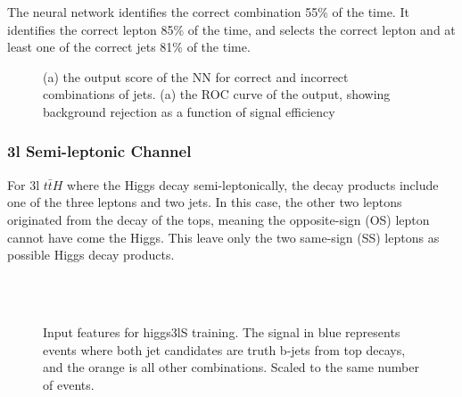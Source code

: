 The neural network identifies the correct combination 55\% of the time. It identifies the correct lepton 85\% of the time, and selects the correct lepton and at least one of the correct jets 81\% of the time. 

\begin{figure}[h!]
  \label{fig:higgs2lSSresults}
  \caption{(a) the output score of the NN for correct and incorrect combinations of jets. (a) the ROC curve of the output, showing background rejection as a function of signal efficiency}
\end{figure} 


\subsubsection{3l Semi-leptonic Channel}
\label{subsec:higgs3lS}

For 3l $t\bar{t}H$ where the Higgs decay semi-leptonically, the decay products include one of the three leptons and two jets. In this case, the other two leptons originated from the decay of the tops, meaning the opposite-sign (OS) lepton cannot have come the Higgs. This leave only the two same-sign (SS) leptons as possible Higgs decay products. 



\begin{figure}[h!]
    \\
    \\
    \caption{Input features for higgs3lS training. The signal in blue represents events where both jet candidates are truth b-jets from top decays, and the orange is all other combinations. Scaled to the same number of events.}
    \label{fig:features_higgs3lS}
\end{figure}

